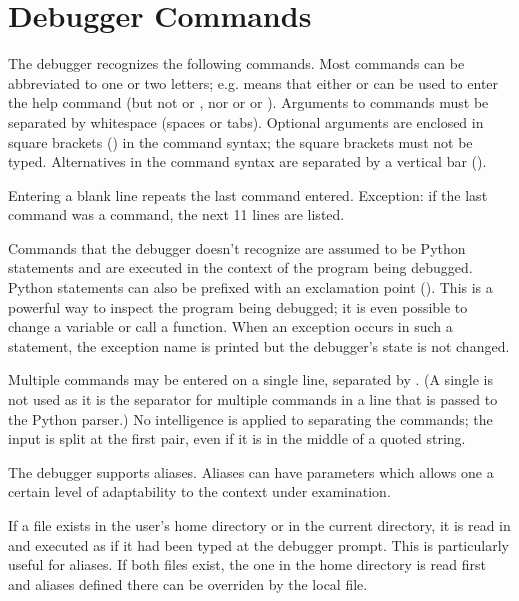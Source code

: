 \section{Debugger Commands \label{debugger-commands}}

The debugger recognizes the following commands.  Most commands can be
abbreviated to one or two letters; e.g.  means that
either  or  can be used to enter the help
command (but not  or , nor  or
 or ).  Arguments to commands must be
separated by whitespace (spaces or tabs).  Optional arguments are
enclosed in square brackets (\samp{[]}) in the command syntax; the
square brackets must not be typed.  Alternatives in the command syntax
are separated by a vertical bar (\samp{|}).

Entering a blank line repeats the last command entered.  Exception: if
the last command was a  command, the next 11 lines are
listed.

Commands that the debugger doesn't recognize are assumed to be Python
statements and are executed in the context of the program being
debugged.  Python statements can also be prefixed with an exclamation
point (\samp{!}).  This is a powerful way to inspect the program
being debugged; it is even possible to change a variable or call a
function.  When an
exception occurs in such a statement, the exception name is printed
but the debugger's state is not changed.

Multiple commands may be entered on a single line, separated by
\samp{;;}.  (A single \samp{;} is not used as it is
the separator for multiple commands in a line that is passed to
the Python parser.)
No intelligence is applied to separating the commands;
the input is split at the first \samp{;;} pair, even if it is in
the middle of a quoted string.

The debugger supports aliases.  Aliases can have parameters which
allows one a certain level of adaptability to the context under
examination.

If a file 
exists in the user's home directory or in the current directory, it is
read in and executed as if it had been typed at the debugger prompt.
This is particularly useful for aliases.  If both files exist, the one
in the home directory is read first and aliases defined there can be
overriden by the local file.

